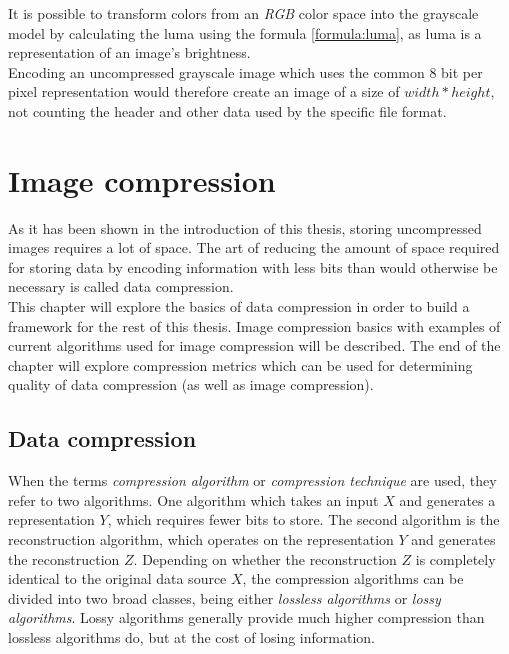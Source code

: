 \documentclass[thesis=M,english]{FITthesis}[2012/10/20]
\begin{document}
It is possible to transform colors from an \emph{RGB} color space into
the grayscale model by calculating the luma using the formula \ref{formula:luma},
as luma is a representation of an image's brightness.
\\

Encoding an uncompressed grayscale image which uses the common 8 bit per pixel
representation would therefore create an image of a size of $width*height$, not counting
the header and other data used by the specific file format.


\chapter{Image compression}
\label{ch:image-compression}
As it has been shown in the introduction of this thesis, storing uncompressed
images requires a lot of space. The art of reducing the amount of space required
for storing data by encoding information with less bits than would otherwise
be necessary is called data compression.
\\

This chapter will explore the basics of data compression in order to build
a framework for the rest of this thesis. Image compression basics with examples
of current algorithms used for image compression will be described. The end of
the chapter will explore compression metrics which can be used for determining
quality of data compression (as well as image compression).


\section{Data compression}
When the terms \emph{compression algorithm} or \emph{compression technique} are
used, they refer to two algorithms. One algorithm which takes an input $X$ and
generates a representation $Y$, which requires fewer bits to store. The second
algorithm is the reconstruction algorithm, which operates on the representation
$Y$ and generates the reconstruction $Z$. Depending on whether the reconstruction
$Z$ is completely identical to the original data source $X$, the compression
algorithms can be divided into two broad classes, being either \emph{lossless
algorithms} or \emph{lossy algorithms}. Lossy algorithms generally provide
much higher compression than lossless algorithms do, but at the cost of
losing information.\cite{datacompression}
\end{document}
